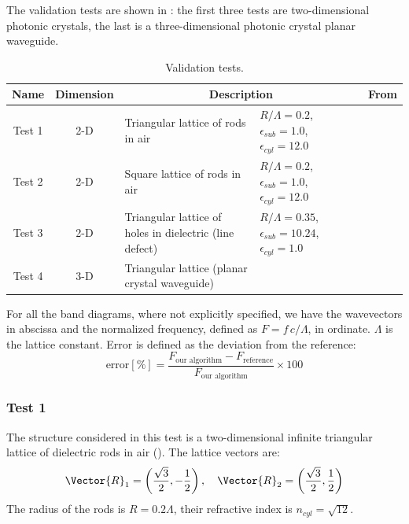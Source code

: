 The validation tests are shown in : the
first three tests are two-dimensional photonic crystals, the last is a
three-dimensional photonic crystal planar waveguide.

\begin{table}[htbp]
  \begin{center}
    \begin{tabular}{|c|c|p{3cm}|p{3cm}|c|}
      \hline
      Name & Dimension & \multicolumn{2}{c|}{Description} & From \\
      \hline
      Test 1 & 2-D & Triangular lattice of rods in air & $R/\Lambda = 0.2$, $\epsilon_{sub} = 1.0$, $\epsilon_{cyl} = 12.0$ & \cite{mpb} \\
      Test 2 & 2-D & Square lattice of rods in air & $R/\Lambda = 0.2$, $\epsilon_{sub} = 1.0$, $\epsilon_{cyl} = 12.0$ & \cite{johnson_photonic} \\
      Test 3 & 2-D & Triangular lattice of holes in dielectric (line defect) & $R/\Lambda = 0.35$, $\epsilon_{sub} = 10.24$, $\epsilon_{cyl} = 1.0$ & \cite{crystalwave} \\
      Test 4 & 3-D & Triangular lattice (planar crystal waveguide) & & \cite{johnson_photonic} \\
      \hline
    \end{tabular}
  \end{center}
  \caption{Validation tests.}
  \label{tab:validation_tests}
\end{table}

For all the band diagrams, where not explicitly specified, we have
the wavevectors in abscissa and the normalized frequency, defined as $F
= f\, c/\Lambda$, in ordinate. $\Lambda$ is the lattice
constant. Error is defined as the deviation from the reference:
\begin{equation*}
  \text{error} [\%] = \frac{F_{\text{our algorithm}} -
  F_{\text{reference}}}{F_{\text{our algorithm}}} \times 100
\end{equation*}
  
\subsubsection{Test 1}

The structure considered in this test is a two-dimensional infinite
triangular lattice of dielectric rods in air
(). The lattice vectors are:
\begin{equation*}
  \Vector{R}_1 = \left( \frac{\sqrt{3}}{2}, -\frac{1}{2} \right),
  \quad \Vector{R}_2 = \left( \frac{\sqrt{3}}{2}, \frac{1}{2} \right)
\end{equation*}
The radius of the rods is $R = 0.2 \Lambda$, their refractive index is
$n_{cyl} = \sqrt{12}$.

